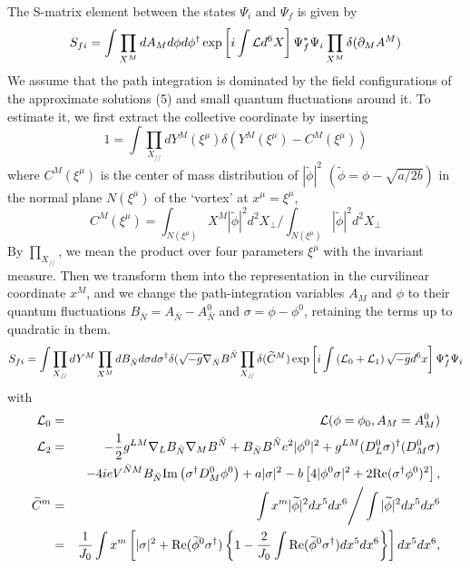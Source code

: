 \documentclass[a4paper,12pt]{article}
\begin{document}
The S-matrix element between the states $\Psi_i$ and $\Psi_f$ is given by  
\begin{equation}
S_{fi}=\int\prod_{X^M}dA_Md\phi d\phi^\dagger
\exp\left[i\int{\cal L}d^6X \right]\Psi_f^*\Psi_i\prod_{X^M}\delta(\partial_MA^M)
  \label{6}  \end{equation}
We assume that the path integration is dominated by the field configurations 
of the approximate solutions (5) and small quantum fluctuations around it.
To estimate it, we first extract the collective coordinate by inserting 
\begin{equation}
1=\int\prod_{X_{/\!/}}dY^M(\xi^\mu)\delta\left(Y^M(\xi^\mu)-C^M(\xi^\mu)\right)
  \label{7}  \end{equation}
where $C^M(\xi^\mu)$ is the center of mass distribution of $|\widetilde\phi|^2$ 
$(\widetilde\phi=\phi-\sqrt{a/2b})$ in the normal plane $N(\xi^\mu)$ 
of the `vortex' at $x^\mu=\xi^\mu$,
\begin{equation}
C^M(\xi^\mu)=\int_{N(\xi^\mu)} X^M |\widetilde\phi|^2 d^2X_{\perp}\Bigg/
                 \int_{N(\xi^\mu)} |\widetilde\phi|^2 d^2X_{\perp}
  \label{8}  \end{equation}
By $\prod_{X_{/\!/}}$, we mean the product over four parameters $\xi^\mu$ 
with the invariant measure.
Then we transform them into the representation in the curvilinear coordinate $x^M$,
and we change the path-integration variables $A_M$ and $\phi$
to their quantum fluctuations $B_{\bar N}= A_{\bar N}-A^0_{\bar N}$ and $\sigma=\phi-\phi^0$,
retaining the terms up to quadratic in them.
\begin{equation}
S_{fi}=\int\prod_{X_{/\!/}}dY^M\prod_{X^M}dB_{\bar N} d\sigma d\sigma^\dagger
\delta(\sqrt{-g} \nabla_{\bar N}B^{\bar N}
\prod_{X_{/\!/}}\delta(\widetilde C^M)
\exp\left[i\int\left({\cal L}_0+{\cal L}_1 \right)\sqrt{-g}d^6x\right]\Psi_f^*\Psi_i
  \label{9}  \end{equation}
with 
\begin{eqnarray}
{\cal L}_0 &=& {\cal L}(\phi=\phi_0, A_M=A_M^0)
  \label{10}  
\\%
{\cal L}_2 &=& 
-\frac{1}{2}g^{LM}\nabla_L B_{\bar N} \nabla_M B^{\bar N}
+B_{\bar N} B^{\bar N} e^2 |\phi^0|^2
+g^{LM}(D_L^0\sigma)^\dagger(D_M^0\sigma)\cr
&&-4ieV^{\bar N M} B_{\bar N} {\rm Im} \left( \sigma^\dagger D_M^0 \phi^0 \right)
+a|\sigma|^2 -b\left[ 4|\phi^0\sigma|^2 +2{\rm Re}(\sigma^\dagger\phi^0)^2\right],
  \label{11}  
\\%
\widetilde C^m &=& \int x^m |\widetilde\phi|^2 dx^5 dx^6 \Bigg/ 
\int |\widetilde\phi|^2 dx^5 dx^6
  \label{12}  
\\%
&=& \frac{1}{J_0}\int x^m \left[|\sigma|^2 + {\rm Re}(\widetilde \phi^0\sigma^\dagger)
\left\{1-\frac{2}{J_0}\int{\rm Re}(\widetilde \phi^0\sigma^\dagger)dx^5 dx^6\right\}\right]dx^5 dx^6,
  \label{13}  \end{eqnarray}
\end{document}
